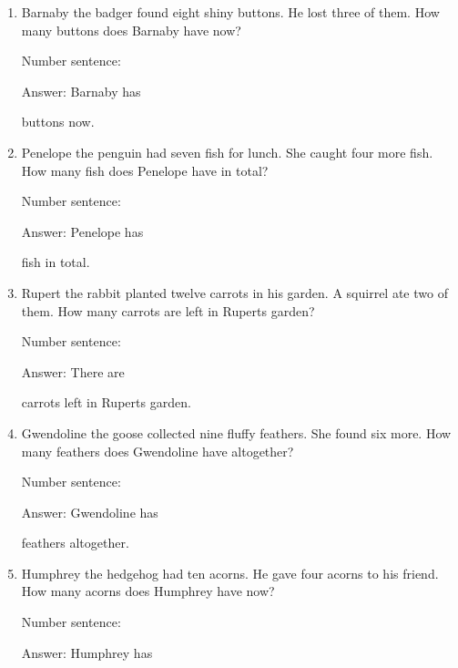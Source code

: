 \documentclass{tufte-book}
\begin{document}
\begin{enumerate}

\item
  Barnaby the badger found eight shiny buttons. He lost three of them.
  How many buttons does Barnaby have now?\medskip\par
  Number sentence:
  \dotfill\medskip\par
  Answer: Barnaby has
  \dotfill\medskip\par\mbox{}\dotfill\medskip\par\mbox{}\dotfill\bigskip
  buttons now.
\item
  Penelope the penguin had seven fish for lunch. She caught four more
  fish. How many fish does Penelope have in total?\medskip\par
  Number sentence:
  \dotfill\medskip\par
  Answer: Penelope has
  \dotfill\medskip\par\mbox{}\dotfill\medskip\par\mbox{}\dotfill\bigskip
  fish in total.
\item
  Rupert the rabbit planted twelve carrots in his garden. A squirrel ate
  two of them. How many carrots are left in Rupert\textquotesingle s
  garden?\medskip\par
  Number sentence:
  \dotfill\medskip\par
  Answer: There are
  \dotfill\medskip\par\mbox{}\dotfill\medskip\par\mbox{}\dotfill\bigskip
  carrots left in Rupert\textquotesingle s garden.
\item
  Gwendoline the goose collected nine fluffy feathers. She found six
  more. How many feathers does Gwendoline have altogether?\medskip\par
  Number sentence:
  \dotfill\medskip\par
  Answer: Gwendoline has
  \dotfill\medskip\par\mbox{}\dotfill\medskip\par\mbox{}\dotfill\bigskip
  feathers altogether.
\item
  Humphrey the hedgehog had ten acorns. He gave four acorns to his
  friend. How many acorns does Humphrey have now?\medskip\par
  Number sentence:
  \dotfill\medskip\par
  Answer: Humphrey has
  \dotfill\medskip\par\mbox{}\dotfill\medskip\par\mbox{}\dotfill\bigskip

\end{enumerate}
\end{document}

